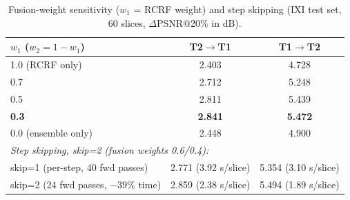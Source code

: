 \begin{table}[htbp]
\centering\small
\caption{Fusion-weight sensitivity ($w_1$ = RCRF weight) and step skipping
(IXI test set, 60 slices, $\Delta$PSNR@20\% in dB).}
\label{tab:weights_en}
\begin{tabular}{lcc}
\toprule
$w_1$ ($w_2 = 1-w_1$) & T2$\to$T1 & T1$\to$T2 \\
\midrule
1.0 (RCRF only) & 2.403 & 4.728 \\
0.7 & 2.712 & 5.248 \\
0.5 & 2.811 & 5.439 \\
\textbf{0.3} & \textbf{2.841} & \textbf{5.472} \\
0.0 (ensemble only) & 2.448 & 4.900 \\
\midrule
\multicolumn{3}{l}{\emph{Step skipping, skip=2 (fusion weights 0.6/0.4):}} \\
\quad skip=1 (per-step, 40 fwd passes) & 2.771 (3.92 s/slice) & 5.354 (3.10 s/slice) \\
\quad skip=2 (24 fwd passes, $-39\%$ time) & 2.859 (2.38 s/slice) & 5.494 (1.89 s/slice) \\
\bottomrule
\end{tabular}
\end{table}
